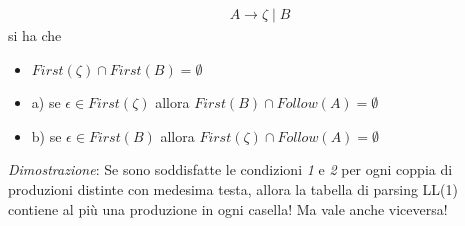 \documentclass[a4paper,12pt]{article}
\begin{document}
{\begin{align*}
  A \to \zeta \mid B
\end{align*}
si ha che
\begin{itemize}
  \item $First(\zeta) \cap First(B) = \emptyset$
  \item a) se $\epsilon \in First(\zeta)$ allora $First(B) \cap Follow(A) = \emptyset$
  \item b) se $\epsilon \in First(B)$ allora $First(\zeta) \cap Follow(A) = \emptyset$
\end{itemize}
\textit{Dimostrazione}: Se sono soddisfatte le condizioni \textit{1} e \textit{2} per ogni coppia di produzioni distinte con medesima testa, allora la tabella di parsing LL(1) contiene al più una produzione in ogni casella! Ma vale anche viceversa! \\
\vspace{1em} \\
}
\end{document}
